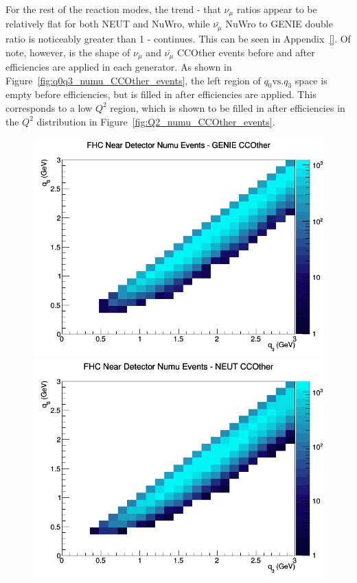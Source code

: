 \documentclass[12pt]{article}
\begin{document}
For the rest of the reaction modes, the trend - that $\nu_{\mu}$ ratios appear to be relatively flat for both NEUT and NuWro, while $\bar{\nu_{\mu}}$ NuWro to GENIE double ratio is noticeably greater than 1 - continues. This can be seen in Appendix~\ref{}. Of note, however, is the shape of $\nu_\mu$ and $\bar{\nu_{\mu}}$ CCOther events before and after efficiencies are applied in each generator. As shown in Figure~\ref{fig:q0q3_numu_CCOther_events}, the left region of $q_0 \textrm{vs.} q_3$ space is empty before efficiencies, but is filled in after efficiencies are applied. This corresponds to a low $Q^2$ region, which is shown to be filled in after efficiencies in the $Q^2$ distribution in Figure~\ref{fig:Q2_numu_CCOther_events}.
\begin{figure}[h]
\centering
{}
\includegraphics[width=\linewidth]{q0_q3/nominal/CCOther_FHC_ND_numu_q3_q0_GENIE.png}
\endminipage
{}
\includegraphics[width=\linewidth]{q0_q3/nominal/CCOther_FHC_ND_numu_q3_q0_NEUT.png}

\end{figure}
\end{document}
